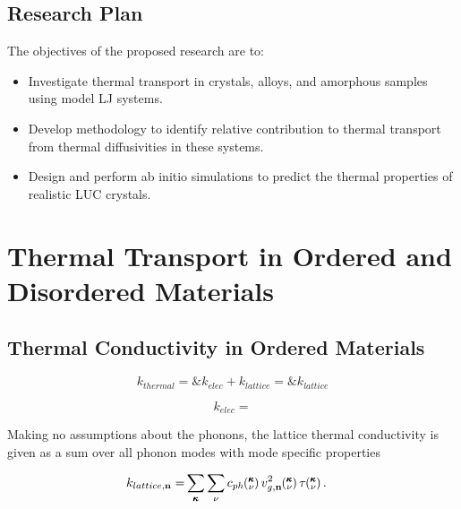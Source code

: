 \documentclass[letterpaper,12pt]{article}
\newcommand{\kv}{\mspace{-4.0mu}\left(\mspace{-8.0mu}\begin{smallmatrix}&\pmb{\kappa} \\&\nu\end{smallmatrix}\mspace{-3.0mu}\right)}
\begin{document}
\subsection{\label{S:Intro-Research-Plan}Research Plan}

The objectives of the proposed research are to:

\begin{itemize}
\item Investigate thermal transport in crystals, alloys, and amorphous samples using model LJ systems. 

\item Develop methodology to identify relative contribution to thermal transport from thermal diffusivities in these systems.  

\item Design and perform ab initio simulations to predict the thermal properties of realistic LUC crystals. 

\end{itemize}

\section{\label{S:Intro-Review}Thermal Transport in Ordered and Disordered Materials}

\subsection*{\label{S:Thermal-Transport-Conductivty}Thermal Conductivity in Ordered Materials}
 
\begin{equation}\label{EQ:M:k_thermal}
k_{thermal} =\& k_{elec} + k_{lattice} 
			=\& k_{lattice}
\end{equation}

\begin{equation}\label{EQ:M:k_thermal}
k_{elec} = 
\end{equation}

%


Making no assumptions about the phonons, the lattice thermal conductivity is given as a sum over all phonon modes with mode specific properties

\begin{equation}\label{EQ:k_sum}
\begin{split}
k_{lattice,\mathbf{n}}=&\sum_{\pmb{\kappa}} \sum_\nu c_{ph} \kv v^{2}_{g,\mathbf{n}} \kv \tau \kv.
\end{split}
\end{equation}
\end{document}
